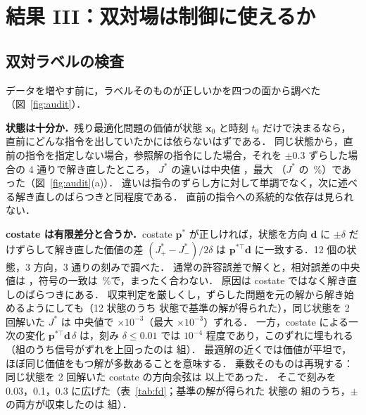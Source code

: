 \section{結果 III：双対場は制御に使えるか}
\label{sec:learning}
\subsection{双対ラベルの検査}
\label{sec:audit}
データを増やす前に，ラベルそのものが正しいかを四つの面から調べた（図~\ref{fig:audit}）．

\textbf{状態は十分か．}残り最適化問題の価値が状態 $\bm x_0$ と時刻 $t_0$ だけで決まるなら，直前にどんな指令を出していたかには依らないはずである．
同じ状態から，直前の指令を指定しない場合，参照解の指令にした場合，それを $\pm0.3$ ずらした場合の 4 通りで解き直したところ，
$J^*$ の違いは中央値 \uzeroSpreadMed，最大 \uzeroSpreadMax（$J^*$ の \uzeroRelMax\,\%）であった（図~\ref{fig:audit}(a)）．
違いは指令のずらし方に対して単調でなく，次に述べる解き直しのばらつきと同程度である．
直前の指令への系統的な依存は見られない．

\textbf{costate は有限差分と合うか．}costate $\bm p^*$ が正しければ，状態を方向 $\bm d$ に $\pm\delta$ だけずらして解き直した価値の差
$(J^*_+-J^*_-)/2\delta$ は $\bm p^{*\top}\bm d$ に一致する．12 個の状態，3 方向，3 通りの刻みで調べた．
通常の許容誤差で解くと，相対誤差の中央値は \fdLooseRel，符号の一致は \fdLooseSign\,\%で，まったく合わない．
原因は costate ではなく解き直しのばらつきにある．
収束判定を厳しくし，ずらした問題を元の解から解き始めるようにしても（12 状態のうち \fdBaseOk 状態で基準の解が得られた），同じ状態を 2 回解いた $J^*$ は
中央値で \fdNoiseMed$\times10^{-3}$（最大 \fdNoiseMax$\times10^{-3}$）ずれる．
一方，costate による一次の変化 $\bm p^{*\top}\bm d\,\delta$ は，刻み $\delta\le0.01$ では $10^{-4}$ 程度であり，このずれに埋もれる
（\fdSmallN 組のうち信号がずれを上回ったのは \fdSmallResolvable 組）．
最適解の近くでは価値が平坦で，ほぼ同じ価値をもつ解が多数あることを意味する．
乗数そのものは再現する：同じ状態を 2 回解いた costate の方向余弦は \fdRepCos 以上であった．
そこで刻みを 0.03，0.1，0.3 に広げた（表~\ref{tab:fd}；基準の解が得られた \fdBaseOk 状態の \fdPairsAll 組のうち，$\pm$の両方が収束したのは \fdPairsOk 組）．


